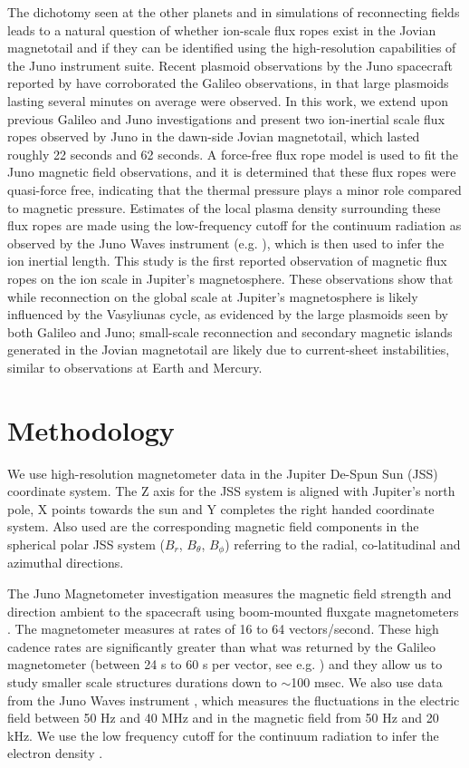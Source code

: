 The dichotomy seen at the other planets and in simulations of reconnecting fields leads to a natural question of whether ion-scale flux ropes exist in the Jovian magnetotail and if they can be identified using the high-resolution capabilities of the Juno instrument suite. Recent plasmoid observations by the Juno spacecraft reported by  have corroborated the Galileo observations, in that large plasmoids lasting several minutes on average were observed. In this work, we extend upon previous Galileo and Juno investigations and present two ion-inertial scale flux ropes observed by Juno in the dawn-side Jovian magnetotail, which lasted roughly 22 seconds and 62 seconds.  A force-free flux rope model is used to fit the Juno magnetic field observations, and it is determined that these flux ropes were quasi-force free, indicating that the thermal pressure plays a minor role compared to magnetic pressure. Estimates of the local plasma density surrounding these flux ropes are made using the low-frequency cutoff for the continuum radiation as observed by the Juno Waves instrument (e.g. ), which is then used to infer the ion inertial length. This study is the first reported observation of magnetic flux ropes on the ion scale in Jupiter’s magnetosphere. These observations show that while reconnection on the global scale at Jupiter’s magnetosphere is likely influenced by the Vasyliunas cycle, as evidenced by the large plasmoids seen by both Galileo and Juno; small-scale reconnection and secondary magnetic islands generated in the Jovian magnetotail are likely due to current-sheet instabilities, similar to observations at Earth and Mercury.


\section{Methodology}
We use high-resolution magnetometer data in the Jupiter De-Spun Sun (JSS) coordinate system.  The Z axis for the JSS system is aligned with Jupiter’s north pole, X points towards the sun and Y completes the right handed coordinate system. Also used are the corresponding magnetic field components in the spherical polar JSS system ($B_r$, $B_\theta$, $B_\phi$) referring to the radial, co-latitudinal and azimuthal directions.

The Juno Magnetometer investigation measures the magnetic field strength and direction ambient to the spacecraft using boom-mounted fluxgate magnetometers \cite{Connerney2017TheInvestigation}. The magnetometer measures at rates of 16 to 64 vectors/second. These high cadence rates are significantly greater than what was returned by the Galileo magnetometer (between 24 s to 60 s per vector, see e.g. ) and they allow us to study smaller scale structures durations down to $\sim$100 msec. We also use data from the Juno Waves instrument \cite{Kurth2017TheInvestigation}, which measures the fluctuations in the electric field between 50 Hz and 40 MHz and in the magnetic field from 50 Hz and 20 kHz. We use the low frequency cutoff for the continuum radiation to infer the electron density \cite{Barnhart2009ElectronSpectra}. 

